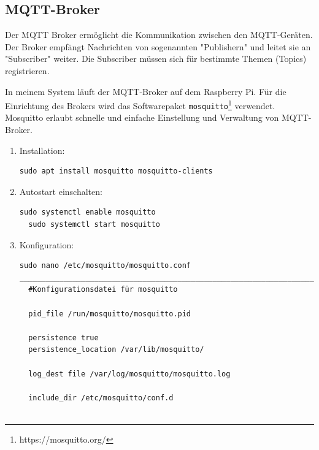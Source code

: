 \documentclass[12pt, letterpaper]{article}
\begin{document}
\subsection{MQTT-Broker}
\par Der MQTT Broker ermöglicht die Kommunikation zwischen den MQTT-Geräten. Der Broker empfängt Nachrichten von sogenannten "Publishern" und leitet sie an "Subscriber" weiter. Die Subscriber müssen sich für bestimmte Themen (Topics) registrieren.
\par In meinem System läuft der MQTT-Broker auf dem Raspberry Pi. Für die Einrichtung des Brokers wird das Softwarepaket \texttt{mosquitto}\footnote[6]{https://mosquitto.org/} verwendet. Mosquitto erlaubt schnelle und einfache Einstellung und Verwaltung von MQTT-Broker. 
\par 
\begin{enumerate}
  \item Installation:
\begin{Verbatim}[frame=single]
  sudo apt install mosquitto mosquitto-clients
\end{Verbatim}
\item Autostart einschalten:
\begin{Verbatim}[frame=single]
  sudo systemctl enable mosquitto
  sudo systemctl start mosquitto
\end{Verbatim}
\item Konfiguration:
\begin{Verbatim}[frame=single]
  sudo nano /etc/mosquitto/mosquitto.conf
_________________________________________________________________________
  #Konfigurationsdatei für mosquitto

  pid_file /run/mosquitto/mosquitto.pid

  persistence true
  persistence_location /var/lib/mosquitto/

  log_dest file /var/log/mosquitto/mosquitto.log

  include_dir /etc/mosquitto/conf.d


\end{Verbatim}
\end{enumerate}
\end{document}
